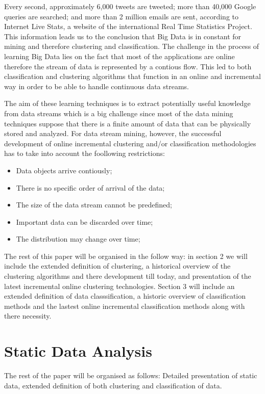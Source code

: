 \documentclass[]{article}
\begin{document}
Every second, approximately 6,000 tweets are tweeted; more than 40,000 Google queries are searched; and more than 2 million emails are sent, according to Internet Live Stats, a website of the international Real Time Statistics Project. This information leads us to the conclusion that Big Data is in constant for mining and therefore clustering and classification.
\noindent The challenge in the process of learning Big Data lies on the fact that most of the applications are online therefore the stream of data is represented by a contious flow. This led to both classification and clustering algorithms that function in an online and incremental way in order to be able to handle continuous data streams.

The aim of these learning techniques is to extract potentially useful knowledge from data streams which is a big challenge since most of the data mining techniques suppose that there is a finite amount of data that can be physically stored and analyzed. For data stream mining, however, the successful development of online incremental clustering and/or classification methodologies has to take into account the foollowing restrictions\cite{silva2013data}:
\begin{itemize}
	\item Data objects arrive contiously;
	\item There  is no specific order of arrival of the data;
	\item The size of the data stream cannot be predefined;
	\item Important data can be discarded over time;
	\item The distribution may change over time;
\end{itemize}

The rest of this paper will be organised in the follow way: in section 2 we will include the extended definition of clustering, a historical overview of the clustering algorithms and there development till today, and presentation of the latest incremental online clustering technologies. Section 3 will include an extended definition of data classsification, a historic overview of classification methods and the lastest online incremental classification methods along with there necessity.

\section{Static Data Analysis}

 The rest of the paper will be organised as follows: Detailed presentation of static data, extended definition of both clustering and classification of data.
\end{document}
